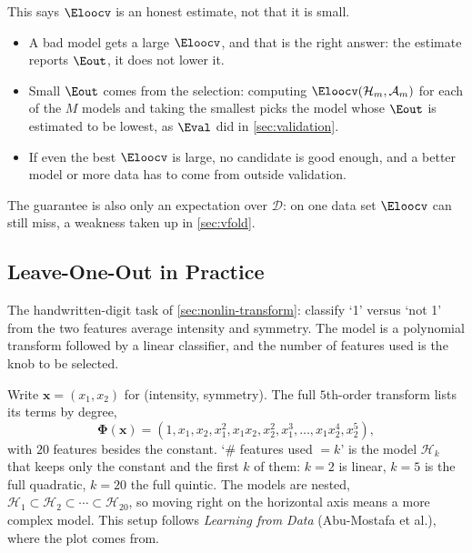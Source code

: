 \begin{remark}
    This says \(\Eloocv\) is an honest estimate, not that it is small.
    \begin{itemize}
        \item A bad model gets a large \(\Eloocv\), and that is the right
            answer: the estimate reports \(\Eout\), it does not lower it.
        \item Small \(\Eout\) comes from the selection: computing
            \(\Eloocv(\mathcal{H}_m, \mathcal{A}_m)\) for each of the \(M\)
            models and taking the smallest picks the model whose \(\Eout\) is
            estimated to be lowest, as \(\Eval\) did in
            \autoref{sec:validation}.
        \item If even the best \(\Eloocv\) is large, no candidate is good
            enough, and a better model or more data has to come from outside
            validation.
    \end{itemize}
    The guarantee is also only an expectation over \(\mathcal{D}\): on one
    data set \(\Eloocv\) can still miss, a weakness taken up in
    \autoref{sec:vfold}.
\end{remark}

\subsection{Leave-One-Out in Practice}

The handwritten-digit task of \autoref{sec:nonlin-transform}: classify `1'
versus `not 1' from the two features average intensity and symmetry. The
model is a polynomial transform followed by a linear classifier, and the
number of features used is the knob to be selected.

\begin{notation}
    Write \(\bm{x} = (x_1, x_2)\) for (intensity, symmetry). The full
    \(5\)th-order transform lists its terms by degree,
    \[
        \bm{\Phi}(\bm{x}) = (1, x_1, x_2, x_1^2, x_1 x_2, x_2^2, x_1^3,
        \ldots, x_1 x_2^4, x_2^5),
    \]
    with \(20\) features besides the constant. `\(\#\) features used \(= k\)'
    is the model \(\mathcal{H}_k\) that keeps only the constant and the first
    \(k\) of them: \(k = 2\) is linear, \(k = 5\) is the full quadratic, \(k =
    20\) the full quintic. The models are nested, \(\mathcal{H}_1 \subset
    \mathcal{H}_2 \subset \cdots \subset \mathcal{H}_{20}\), so moving right
    on the horizontal axis means a more complex model. This setup follows
    \emph{Learning from Data} (Abu-Mostafa et al.), where the plot comes from.
\end{notation}

